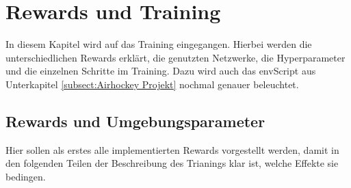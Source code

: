 \chapter{Rewards und Training}  
\label{ch:rewards_training}
In diesem Kapitel wird auf das Training eingegangen. Hierbei werden die unterschiedlichen Rewards erklärt, die genutzten Netzwerke, die Hyperparameter und die einzelnen Schritte im Training. Dazu wird auch das envScript aus Unterkapitel \ref{subsect:Airhockey Projekt} nochmal genauer beleuchtet.

\section{Rewards und Umgebungsparameter}
\label{sect:rewards_params}
Hier sollen als erstes alle implementierten Rewards vorgestellt werden, damit in den folgenden Teilen der Beschreibung des Trianings klar ist, welche Effekte sie bedingen.

